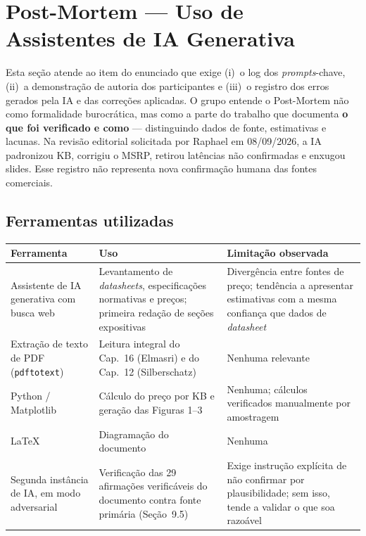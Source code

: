 \documentclass[11pt,a4paper]{article}
\begin{document}
\section{Post-Mortem --- Uso de Assistentes de IA Generativa}

Esta seção atende ao item do enunciado que exige (i)~o log dos \emph{prompts}-chave,
(ii)~a demonstração de autoria dos participantes e (iii)~o registro dos erros gerados pela
IA e das correções aplicadas. O grupo entende o Post-Mortem não como formalidade
burocrática, mas como a parte do trabalho que documenta \textbf{o que foi verificado e como}
--- distinguindo dados de fonte, estimativas e lacunas.
Na revisão editorial solicitada por Raphael em 08/09/2026, a IA padronizou KB,
corrigiu o MSRP, retirou latências não confirmadas e enxugou slides. Esse registro
não representa nova confirmação humana das fontes comerciais.

\subsection{Ferramentas utilizadas}

\begin{center}\small
\begin{tabular}{@{}p{4.2cm}p{5.0cm}p{6.0cm}@{}}
\toprule
\textbf{Ferramenta} & \textbf{Uso} & \textbf{Limitação observada} \\
\midrule
Assistente de IA generativa com busca web & Levantamento de \emph{datasheets},
especificações normativas e preços; primeira redação de seções expositivas &
Divergência entre fontes de preço; tendência a apresentar estimativas com a mesma
confiança que dados de \emph{datasheet} \\
Extração de texto de PDF (\texttt{pdftotext}) & Leitura integral do Cap.~16 (Elmasri) e do
Cap.~12 (Silberschatz) & Nenhuma relevante \\
Python / Matplotlib & Cálculo do preço por KB e geração das Figuras 1--3 &
Nenhuma; cálculos verificados manualmente por amostragem \\
\LaTeX & Diagramação do documento & Nenhuma \\
Segunda instância de IA, em modo adversarial & Verificação das 29 afirmações
verificáveis do documento contra fonte primária (Seção~9.5) & Exige instrução explícita de
não confirmar por plausibilidade; sem isso, tende a validar o que soa razoável \\
\bottomrule
\end{tabular}
\end{center}
\end{document}
